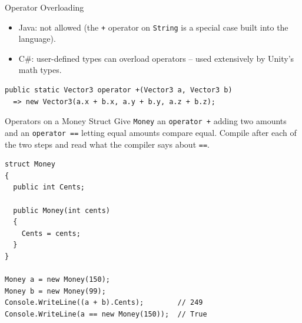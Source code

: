 \begin{frame}[fragile]{Operator Overloading}
  \begin{itemize}
    \item Java: not allowed (the \texttt{+} operator on \texttt{String}
      is a special case built into the language).
    \item C\#: user-defined types can overload operators -- used
      extensively by Unity's math types.
  \end{itemize}
  \begin{lstlisting}
public static Vector3 operator +(Vector3 a, Vector3 b)
  => new Vector3(a.x + b.x, a.y + b.y, a.z + b.z);
  \end{lstlisting}
  \pause
  \vfill


\end{frame}

\begin{exerciseframe}{Operators on a Money Struct}
  Give \texttt{Money} an \texttt{operator +} adding two amounts and an
  \texttt{operator ==} letting equal amounts compare equal. Compile after each
  of the two steps and read what the compiler says about \texttt{==}.
  \vspace{1ex}

  \begin{lstlisting}[basicstyle=\scriptsize\ttfamily]
struct Money
{
  public int Cents;

  public Money(int cents)
  {
    Cents = cents;
  }
}

Money a = new Money(150);
Money b = new Money(99);
Console.WriteLine((a + b).Cents);        // 249
Console.WriteLine(a == new Money(150));  // True
  \end{lstlisting}
\end{exerciseframe}

